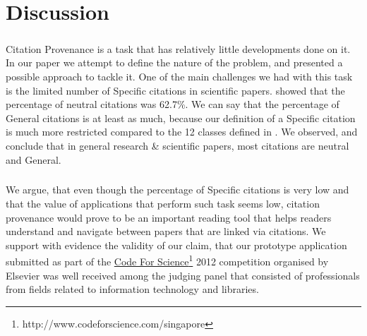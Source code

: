 \chapter{Discussion}
\label{discussion}
\paragraph{}
Citation Provenance is a task that has relatively little developments done on it. In our paper we attempt to define the nature of the problem, and presented a possible approach to tackle it. One of the main challenges we had with this task is the limited number of Specific citations in scientific papers. \cite{teufel2009annotation} showed that the percentage of neutral citations was 62.7\%. We can say that the percentage of General citations is at least as much, because our definition of a Specific citation is much more restricted compared to the 12 classes defined in \cite{teufel2009annotation}. We observed, and conclude that in general research \& scientific papers, most citations are neutral and General.

\paragraph{}
We argue, that even though the percentage of Specific citations is very low and that the value of applications that perform such task seems low, citation provenance would prove to be an important reading tool that helps readers understand and navigate between papers that are linked via citations. We support with evidence the validity of our claim, that our prototype application submitted as part of the \url{Code For Science}\footnote{http://www.codeforscience.com/singapore} 2012 competition organised by Elsevier was well received among the judging panel that consisted of professionals from fields related to information technology and libraries.